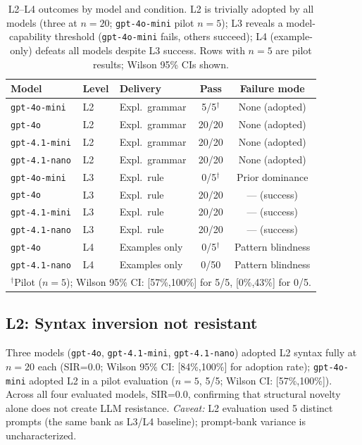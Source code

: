 \begin{table}[!t]
\centering
\caption{L2--L4 outcomes by model and condition. L2 is trivially adopted by all models (three at $n=20$; \texttt{gpt-4o-mini} pilot $n=5$); L3 reveals a model-capability threshold (\texttt{gpt-4o-mini} fails, others succeed); L4 (example-only) defeats all models despite L3 success. Rows with $n=5$ are pilot results; Wilson 95\% CIs shown.}
\label{tab:l234_results}
\footnotesize
\begin{tabular}{@{}lllcc@{}}
\toprule
\textbf{Model} & \textbf{Level} & \textbf{Delivery} & \textbf{Pass} & \textbf{Failure mode} \\
\midrule
\texttt{gpt-4o-mini} & L2 & Expl.\ grammar & \cellcolor{green!15}5/5$^\dagger$   & None (adopted) \\
\texttt{gpt-4o}      & L2 & Expl.\ grammar & \cellcolor{green!15}20/20 & None (adopted) \\
\texttt{gpt-4.1-mini}& L2 & Expl.\ grammar & \cellcolor{green!15}20/20 & None (adopted) \\
\texttt{gpt-4.1-nano}& L2 & Expl.\ grammar & \cellcolor{green!15}20/20 & None (adopted) \\
\midrule
\texttt{gpt-4o-mini} & L3 & Expl.\ rule    & \cellcolor{red!10}0/5$^\dagger$   & Prior dominance \\
\texttt{gpt-4o}      & L3 & Expl.\ rule    & \cellcolor{green!15}20/20 & --- (success) \\
\texttt{gpt-4.1-mini}& L3 & Expl.\ rule    & \cellcolor{green!15}20/20 & --- (success) \\
\texttt{gpt-4.1-nano}& L3 & Expl.\ rule    & \cellcolor{green!15}20/20 & --- (success) \\
\midrule
\texttt{gpt-4o}      & L4 & Examples only & \cellcolor{red!10}0/5$^\dagger$   & Pattern blindness \\
\texttt{gpt-4.1-nano}& L4 & Examples only & \cellcolor{red!10}0/50  & Pattern blindness \\
\bottomrule
\multicolumn{5}{l}{\scriptsize $^\dagger$Pilot ($n=5$); Wilson 95\% CI: [57\%,100\%] for 5/5, [0\%,43\%] for 0/5.} \\
\end{tabular}
\end{table}

\subsection{L2: Syntax inversion not resistant}
Three models (\texttt{gpt-4o}, \texttt{gpt-4.1-mini}, \texttt{gpt-4.1-nano}) adopted L2 syntax fully at $n=20$ each (SIR=0.0; Wilson 95\% CI: [84\%,100\%] for adoption rate); \texttt{gpt-4o-mini} adopted L2 in a pilot evaluation ($n=5$, 5/5; Wilson CI: [57\%,100\%]). Across all four evaluated models, SIR=0.0, confirming that structural novelty alone does not create LLM resistance. \textit{Caveat:} L2 evaluation used 5 distinct prompts (the same bank as L3/L4 baseline); prompt-bank variance is uncharacterized.


